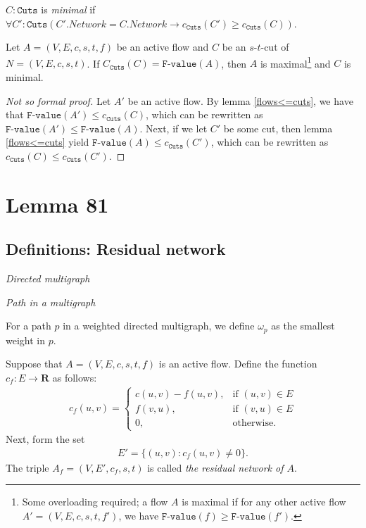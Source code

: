 \documentclass{article}
\begin{document}
\begin{definition}
    $C: \texttt{Cuts}$ is \textit{minimal} if $\forall C' : \texttt{Cuts}(C'.Network = C.Network \to c_{\texttt{Cuts}}(C') \geq c_{\texttt{Cuts}}(C))$.
\end{definition}

\begin{superlemma}\label{superlemma1}
    Let $A=(V, E, c, s, t, f)$ be an active flow and $C$ be an $s$-$t$-cut of $N=(V, E, c, s, t)$. If $C_{\texttt{Cuts}}(C)=\texttt{F-value}(A)$, then $A$ is maximal\footnote{Some overloading required; a flow $A$ is maximal if for any other active flow $A'=(V, E, c, s, t, f')$, we have $\texttt{F-value}(f) \geq \texttt{F-value}(f')$.} and $C$ is minimal.
\end{superlemma}
\begin{proof}[Not so formal proof]
    Let $A'$ be an active flow. By lemma \ref{flows<=cuts}, we have that $\texttt{F-value}(A') \leq c_{\texttt{Cuts}}(C)$, which can be rewritten as $\texttt{F-value}(A') \leq \texttt{F-value}(A)$. Next, if we let $C'$ be some cut, then lemma \ref{flows<=cuts} yield $\texttt{F-value}(A) \leq c_{\texttt{Cuts}}(C')$, which can be rewritten as $c_{\texttt{Cuts}}(C) \leq c_{\texttt{Cuts}}(C')$.
\end{proof}

\section{Lemma 81}
\subsection{Definitions: Residual network}
\begin{definition}
    \textit{Directed multigraph}
\end{definition}
\begin{definition}
    \textit{Path in a multigraph}
\end{definition}

\begin{definition}
    For a path $p$ in a weighted directed multigraph, we define $\omega_p$ as the smallest weight in $p$.
\end{definition}

\begin{definition}
    Suppose that $A=(V, E, c, s, t, f)$ is an active flow. Define the function $c_f: E \to \mathbf{R}$ as follows:
    \begin{align*}
        c_f(u, v) =
        \begin{cases}
            c(u, v)-f(u, v), & \text{if } (u, v) \in E\\
            f(v, u), & \text{if } (v, u) \in E\\
            0, & \text{otherwise}.
        \end{cases}
    \end{align*}
    Next, form the set
    \begin{align*}
        E' = \{(u, v): c_f(u, v) \neq 0\}.
    \end{align*}
    The triple $A_f=(V, E', c_f, s, t)$ is called \textit{the residual network of $A$}.
\end{definition}
\end{document}
